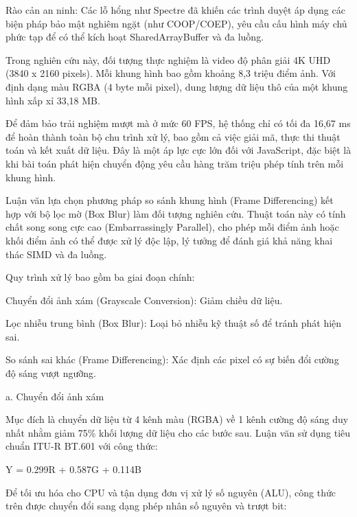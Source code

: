 Rào cản an ninh: Các lỗ hổng như Spectre đã khiến các trình duyệt áp dụng các biện pháp bảo mật nghiêm ngặt (như COOP/COEP), yêu cầu cấu hình máy chủ phức tạp để có thể kích hoạt SharedArrayBuffer và đa luồng.




Trong nghiên cứu này, đối tượng thực nghiệm là video độ phân giải 4K UHD (3840 x 2160 pixels). Mỗi khung hình bao gồm khoảng 8,3 triệu điểm ảnh. Với định dạng màu RGBA (4 byte mỗi pixel), dung lượng dữ liệu thô của một khung hình xấp xỉ 33,18 MB.


Để đảm bảo trải nghiệm mượt mà ở mức 60 FPS, hệ thống chỉ có tối đa 16,67 ms để hoàn thành toàn bộ chu trình xử lý, bao gồm cả việc giải mã, thực thi thuật toán và kết xuất dữ liệu. Đây là một áp lực cực lớn đối với JavaScript, đặc biệt là khi bài toán phát hiện chuyển động yêu cầu hàng trăm triệu phép tính trên mỗi khung hình.



Luận văn lựa chọn phương pháp so sánh khung hình (Frame Differencing) kết hợp với bộ lọc mờ (Box Blur) làm đối tượng nghiên cứu. Thuật toán này có tính chất song song cực cao (Embarrassingly Parallel), cho phép mỗi điểm ảnh hoặc khối điểm ảnh có thể được xử lý độc lập, lý tưởng để đánh giá khả năng khai thác SIMD và đa luồng.


Quy trình xử lý bao gồm ba giai đoạn chính:


Chuyển đổi ảnh xám (Grayscale Conversion): Giảm chiều dữ liệu.


Lọc nhiễu trung bình (Box Blur): Loại bỏ nhiễu kỹ thuật số để tránh phát hiện sai.


So sánh sai khác (Frame Differencing): Xác định các pixel có sự biến đổi cường độ sáng vượt ngưỡng.



a. Chuyển đổi ảnh xám


Mục đích là chuyển dữ liệu từ 4 kênh màu (RGBA) về 1 kênh cường độ sáng duy nhất nhằm giảm 75\% khối lượng dữ liệu cho các bước sau. Luận văn sử dụng tiêu chuẩn ITU-R BT.601 với công thức:


Y = 0.299R + 0.587G + 0.114B


Để tối ưu hóa cho CPU và tận dụng đơn vị xử lý số nguyên (ALU), công thức trên được chuyển đổi sang dạng phép nhân số nguyên và trượt bit:


